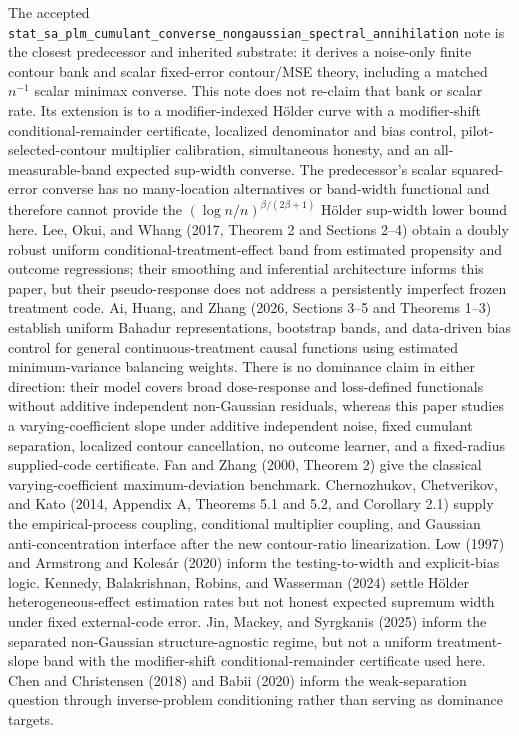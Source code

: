 \documentclass{article}
\begin{document}
The accepted \texttt{stat\_sa\_plm\_cumulant\_converse\_nongaussian\_spectral\_annihilation} note is the closest predecessor and inherited substrate: it derives a noise-only finite contour bank and scalar fixed-error contour/MSE theory, including a matched \(n^{-1}\) scalar minimax converse. This note does not re-claim that bank or scalar rate. Its extension is to a modifier-indexed Hölder curve with a modifier-shift conditional-remainder certificate, localized denominator and bias control, pilot-selected-contour multiplier calibration, simultaneous honesty, and an all-measurable-band expected sup-width converse. The predecessor's scalar squared-error converse has no many-location alternatives or band-width functional and therefore cannot provide the \((\log n/n)^{\beta/(2\beta+1)}\) Hölder sup-width lower bound here. Lee, Okui, and Whang (2017, Theorem 2 and Sections 2--4) obtain a doubly robust uniform conditional-treatment-effect band from estimated propensity and outcome regressions; their smoothing and inferential architecture informs this paper, but their pseudo-response does not address a persistently imperfect frozen treatment code. Ai, Huang, and Zhang (2026, Sections 3--5 and Theorems 1--3) establish uniform Bahadur representations, bootstrap bands, and data-driven bias control for general continuous-treatment causal functions using estimated minimum-variance balancing weights. There is no dominance claim in either direction: their model covers broad dose-response and loss-defined functionals without additive independent non-Gaussian residuals, whereas this paper studies a varying-coefficient slope under additive independent noise, fixed cumulant separation, localized contour cancellation, no outcome learner, and a fixed-radius supplied-code certificate. Fan and Zhang (2000, Theorem 2) give the classical varying-coefficient maximum-deviation benchmark. Chernozhukov, Chetverikov, and Kato (2014, Appendix A, Theorems 5.1 and 5.2, and Corollary 2.1) supply the empirical-process coupling, conditional multiplier coupling, and Gaussian anti-concentration interface after the new contour-ratio linearization. Low (1997) and Armstrong and Kolesár (2020) inform the testing-to-width and explicit-bias logic. Kennedy, Balakrishnan, Robins, and Wasserman (2024) settle Hölder heterogeneous-effect estimation rates but not honest expected supremum width under fixed external-code error. Jin, Mackey, and Syrgkanis (2025) inform the separated non-Gaussian structure-agnostic regime, but not a uniform treatment-slope band with the modifier-shift conditional-remainder certificate used here. Chen and Christensen (2018) and Babii (2020) inform the weak-separation question through inverse-problem conditioning rather than serving as dominance targets.
\end{document}
